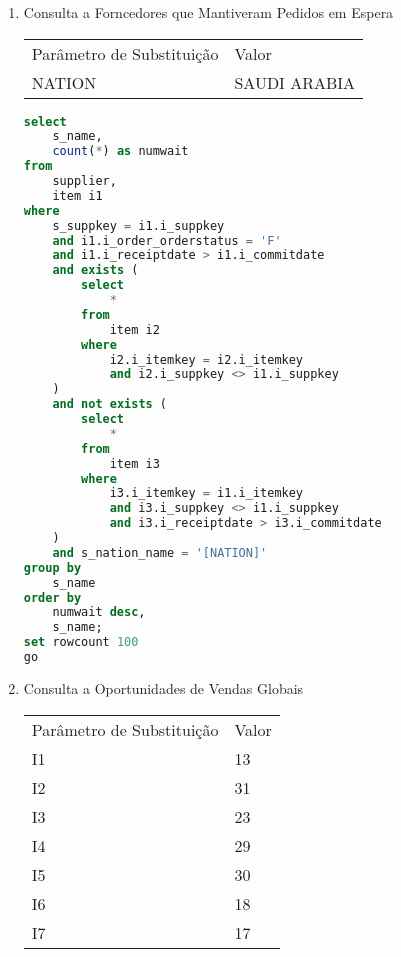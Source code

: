 \begin{enumerate}
\begin{lstlisting}[language=SQL]
\end{lstlisting}

\item Consulta a Forncedores que Mantiveram Pedidos em Espera

\begin{tabular}{ll}
	Parâmetro de Substituição & Valor\\
	NATION & SAUDI ARABIA\\
\end{tabular}

	\begin{lstlisting}[language=SQL]
select
    s_name,
    count(*) as numwait
from
    supplier,
    item i1
where
    s_suppkey = i1.i_suppkey
    and i1.i_order_orderstatus = 'F'
    and i1.i_receiptdate > i1.i_commitdate
    and exists (
        select
            *
        from
            item i2
        where
            i2.i_itemkey = i2.i_itemkey
            and i2.i_suppkey <> i1.i_suppkey
    )
    and not exists (
        select
            *
        from
            item i3
        where
            i3.i_itemkey = i1.i_itemkey
            and i3.i_suppkey <> i1.i_suppkey
            and i3.i_receiptdate > i3.i_commitdate
    )
    and s_nation_name = '[NATION]'
group by
    s_name
order by
    numwait desc,
    s_name;
set rowcount 100
go
	\end{lstlisting}

\item Consulta a Oportunidades de Vendas Globais

\begin{tabular}{ll}
	Parâmetro de Substituição & Valor\\
	I1 & 13 \\
	I2 & 31 \\
	I3 & 23 \\
	I4 & 29 \\
	I5 & 30 \\
	I6 & 18 \\
	I7 & 17 \\
\end{tabular}


\end{enumerate}
